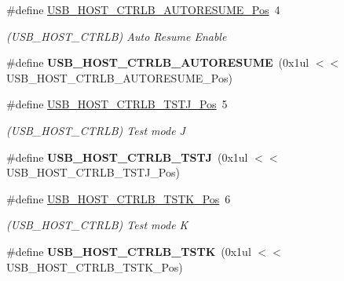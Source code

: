 \begin{DoxyCompactItemize}
\item 
\hypertarget{group___s_a_m_l21___u_s_b_ga914e09885ed1fcd8c601de3ad4606a5b}{}\#define \hyperlink{group___s_a_m_l21___u_s_b_ga914e09885ed1fcd8c601de3ad4606a5b}{U\+S\+B\+\_\+\+H\+O\+S\+T\+\_\+\+C\+T\+R\+L\+B\+\_\+\+A\+U\+T\+O\+R\+E\+S\+U\+M\+E\+\_\+\+Pos}~4\label{group___s_a_m_l21___u_s_b_ga914e09885ed1fcd8c601de3ad4606a5b}

\begin{DoxyCompactList}\small\item\em (U\+S\+B\+\_\+\+H\+O\+S\+T\+\_\+\+C\+T\+R\+L\+B) Auto Resume Enable \end{DoxyCompactList}\item 
\hypertarget{group___s_a_m_l21___u_s_b_ga4167ef21a383c6caba7a833184824cee}{}\#define {\bfseries U\+S\+B\+\_\+\+H\+O\+S\+T\+\_\+\+C\+T\+R\+L\+B\+\_\+\+A\+U\+T\+O\+R\+E\+S\+U\+M\+E}~(0x1ul $<$$<$ U\+S\+B\+\_\+\+H\+O\+S\+T\+\_\+\+C\+T\+R\+L\+B\+\_\+\+A\+U\+T\+O\+R\+E\+S\+U\+M\+E\+\_\+\+Pos)\label{group___s_a_m_l21___u_s_b_ga4167ef21a383c6caba7a833184824cee}

\item 
\hypertarget{group___s_a_m_l21___u_s_b_ga8bc3256c5628847d62171dddaa95328a}{}\#define \hyperlink{group___s_a_m_l21___u_s_b_ga8bc3256c5628847d62171dddaa95328a}{U\+S\+B\+\_\+\+H\+O\+S\+T\+\_\+\+C\+T\+R\+L\+B\+\_\+\+T\+S\+T\+J\+\_\+\+Pos}~5\label{group___s_a_m_l21___u_s_b_ga8bc3256c5628847d62171dddaa95328a}

\begin{DoxyCompactList}\small\item\em (U\+S\+B\+\_\+\+H\+O\+S\+T\+\_\+\+C\+T\+R\+L\+B) Test mode J \end{DoxyCompactList}\item 
\hypertarget{group___s_a_m_l21___u_s_b_gaa25108325eaf15ed3ad2eedf436f3650}{}\#define {\bfseries U\+S\+B\+\_\+\+H\+O\+S\+T\+\_\+\+C\+T\+R\+L\+B\+\_\+\+T\+S\+T\+J}~(0x1ul $<$$<$ U\+S\+B\+\_\+\+H\+O\+S\+T\+\_\+\+C\+T\+R\+L\+B\+\_\+\+T\+S\+T\+J\+\_\+\+Pos)\label{group___s_a_m_l21___u_s_b_gaa25108325eaf15ed3ad2eedf436f3650}

\item 
\hypertarget{group___s_a_m_l21___u_s_b_ga193b32fec2fe3e88292cce5099c873ba}{}\#define \hyperlink{group___s_a_m_l21___u_s_b_ga193b32fec2fe3e88292cce5099c873ba}{U\+S\+B\+\_\+\+H\+O\+S\+T\+\_\+\+C\+T\+R\+L\+B\+\_\+\+T\+S\+T\+K\+\_\+\+Pos}~6\label{group___s_a_m_l21___u_s_b_ga193b32fec2fe3e88292cce5099c873ba}

\begin{DoxyCompactList}\small\item\em (U\+S\+B\+\_\+\+H\+O\+S\+T\+\_\+\+C\+T\+R\+L\+B) Test mode K \end{DoxyCompactList}\item 
\hypertarget{group___s_a_m_l21___u_s_b_ga57d13e780ef59d8be1e7df0109e82893}{}\#define {\bfseries U\+S\+B\+\_\+\+H\+O\+S\+T\+\_\+\+C\+T\+R\+L\+B\+\_\+\+T\+S\+T\+K}~(0x1ul $<$$<$ U\+S\+B\+\_\+\+H\+O\+S\+T\+\_\+\+C\+T\+R\+L\+B\+\_\+\+T\+S\+T\+K\+\_\+\+Pos)\label{group___s_a_m_l21___u_s_b_ga57d13e780ef59d8be1e7df0109e82893}


\end{DoxyCompactItemize}
